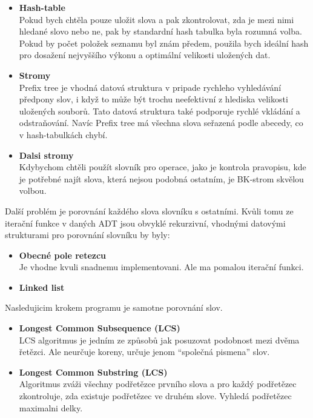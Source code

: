 \documentclass[11pt]{article}
\begin{document}
\begin{itemize}
\item \textbf{Hash-table}\\
Pokud bych chtěla pouze uložit slova a pak zkontrolovat, zda je mezi nimi hledané slovo nebo ne, pak by standardní hash tabulka byla rozumná volba. Pokud by počet položek seznamu byl znám předem, použila bych ideální hash pro dosažení nejvyššího výkonu a optimální velikosti uložených dat.
\item \textbf{Stromy}\\
	Prefix tree je vhodná datová struktura v pripade rychleho vyhledávání předpony slov, i když to může být trochu neefektivní z hlediska velikosti uložených souborů. Tato datová struktura také podporuje rychlé vkládání a odstraňování. Navíc Prefix tree má všechna slova seřazená podle abecedy, co v hash-tabulkách chybí.
\item \textbf{Dalsi stromy}\\
	Kdybychom chtěli použít slovník pro operace, jako je kontrola pravopisu, kde je potřebné najít slova, která nejsou podobná ostatním, je BK-strom skvělou volbou.
\end{itemize}
Další problém je porovnání každého slova slovníku s ostatními. Kvůli tomu ze iterační funkce v daných ADT jsou obvyklé rekurzivní, vhodnými datovými strukturami pro porovnání slovníku by byly:

\begin{itemize}
  \item \textbf{Obecné pole retezcu}\\
Je vhodne kvuli snadnemu implementovani. Ale ma pomalou iterační funkci.
  \item \textbf{Linked list}\\
\end{itemize}

Nasledujicim krokem programu je samotne porovnání slov.

\begin{itemize}
  \item \textbf{Longest Common Subsequence (LCS)}\\
	LCS algoritmus je jedním ze způsobů jak posuzovat podobnost mezi dvěma řetězci. Ale neurčuje koreny, určuje jenom “společná pismena” slov.
  \item \textbf{Longest Common Substring (LCS)}\\
	 Algoritmus zváži všechny podřetězce prvního slova a pro každý podřetězec zkontroluje, zda existuje podřetězec ve druhém slove. Vyhledá podřetězec maximalni delky.
\end{itemize}
\end{document}
